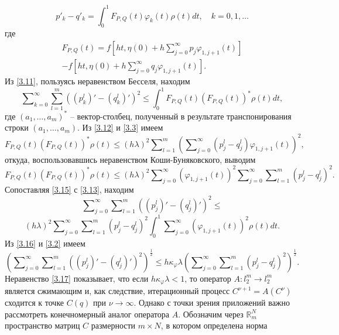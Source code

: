 \begin{equation}\label{3.11}
p'_k-q'_k=\int_{0}^1F_{P,Q}(t)\varphi_k(t)\rho(t)dt,\quad k=0,1,\ldots
\end{equation}
где
\begin{multline}\label{3.12}
 F_{P,Q}(t)=f\left[ht,\eta(0)+ h\sum\nolimits_{j=0}^\infty p_j\varphi_{1,j+1}(t)\right] \\
  -f\left[ht,\eta(0)+ h\sum\nolimits_{j=0}^\infty q_j\varphi_{1,j+1}(t)\right].
\end{multline}
Из \eqref{3.11}, пользуясь неравенством Бесселя, находим
 \begin{equation}\label{3.13}
\sum\nolimits_{k=0}^\infty \sum_{l=1}^m((p^l_k)'-(q^l_k)')^2\le\int_{0}^1F_{P,Q}(t)(F_{P,Q}(t))^*\rho(t) dt,
\end{equation}
где $(a_1,\ldots,a_m)^*$ -- вектор-столбец, полученный в результате транспонирования строки $(a_1,\ldots,a_m)$.
Из \eqref{3.12} и \eqref{3.3}  имеем
 \begin{equation}\label{3.15}
F_{P,Q}(t)(F_{P,Q}(t))^*\rho(t)\le (h\lambda)^2 \sum\nolimits_{l=1}^m  \left(\sum\nolimits_{j=0}^\infty( p^l_j-q^l_j)\varphi_{1,j+1}(t)\right)^2,
\end{equation}
откуда,  воспользовавшись неравенством Коши-Буняковского, выводим
$$
F_{P,Q}(t)(F_{P,Q}(t))^*\rho(t)\le(h\lambda)^2  \sum\nolimits_{j=0}^\infty(\varphi_{1,j+1}(t))^2 \sum\nolimits_{j=0}^\infty\sum\nolimits_{l=1}^m( p^l_j-q^l_j)^2.
$$
Сопоставляя \eqref{3.15} с \eqref{3.13}, находим
$$
\sum\nolimits_{j=0}^\infty\sum\nolimits_{l=1}^m((p^l_j)'-(q^l_j)')^2\le
$$
\begin{equation}\label{3.16}
(h\lambda)^2 \sum\nolimits_{j=0}^\infty\sum\nolimits_{l=1}^m( p^l_j-q^l_j)^2\int_{0}^1 \sum\nolimits_{j=0}^\infty(\varphi_{1,j+1}(t))^2\rho(t) dt.
\end{equation}
Из  \eqref{3.16}  и \eqref{3.2} имеем
\begin{equation}\label{3.17}
\left(\sum\nolimits_{j=0}^\infty\sum\nolimits_{l=1}^m((p^l_j)'-(q^l_j)')^2\right)^\frac12\le h\kappa_\varphi\lambda \left(\sum\nolimits_{j=0}^\infty\sum\nolimits_{l=1}^m( p^l_j-q^l_j)^2\right)^\frac12.
\end{equation}
Неравенство \eqref{3.17} показывает, что если $h\kappa_\varphi\lambda<1$, то оператор  $A:l_2^m\to l_2^m$ является сжимающим и, как следствие, итерационный процесс $C^{\nu+1}=A(C^{\nu})$  сходится к точке $C(q)$ при $\nu\to\infty$. Однако с точки зрения приложений важно рассмотреть конечномерный аналог оператора $A$. Обозначим через $\mathbb{R}^N_m$ пространство матриц $C$ размерности $m\times N$, в котором определена норма

